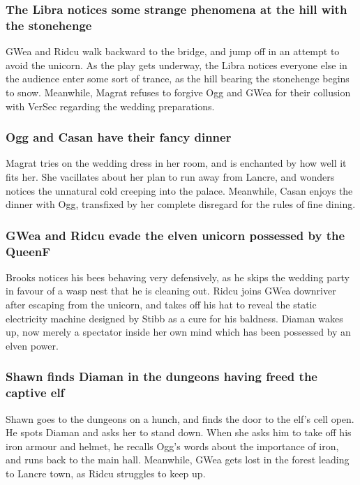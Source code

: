 \subsubsection{The \Gls{Libra} notices some strange phenomena at the hill with the stonehenge}
\Gls{GWea} and \Gls{Ridcu} walk backward to the bridge, and jump off in an attempt to avoid the
unicorn. As the play gets underway, the \Gls{Libra} notices everyone else in the audience enter some
sort of trance, as the hill bearing the stonehenge begins to snow. Meanwhile, \Gls{Magrat} refuses
to forgive \Gls{Ogg} and \Gls{GWea} for their collusion with \Gls{VerSec} regarding the wedding
preparations.

\subsubsection{\Gls{Ogg} and \Gls{Casan} have their fancy dinner}
\Gls{Magrat} tries on the wedding dress in her room, and is enchanted by how well it fits her. She
vacillates about her plan to run away from Lancre, and wonders notices the unnatural cold creeping
into the palace. Meanwhile, \Gls{Casan} enjoys the dinner with \Gls{Ogg}, transfixed by her complete
disregard for the rules of fine dining.

\subsubsection{\Gls{GWea} and \Gls{Ridcu} evade the elven unicorn possessed by the \Gls{QueenF}}
\Gls{Brooks} notices his bees behaving very defensively, as he skips the wedding party in favour of
a wasp nest that he is cleaning out. \Gls{Ridcu} joins \Gls{GWea} downriver after escaping from the
unicorn, and takes off his hat to reveal the static electricity machine designed by \Gls{Stibb} as a
cure for his baldness. \Gls{Diaman} wakes up, now merely a spectator inside her own mind which has
been possessed by an elven power.

\subsubsection{\Gls{Shawn} finds \Gls{Diaman} in the dungeons having freed the captive elf}
\Gls{Shawn} goes to the dungeons on a hunch, and finds the door to the elf's cell open. He spots
\Gls{Diaman} and asks her to stand down. When she asks him to take off his iron armour and helmet,
he recalls \Gls{Ogg}'s words about the importance of iron, and runs back to the main hall.
Meanwhile, \Gls{GWea} gets lost in the forest leading to Lancre town, as \Gls{Ridcu} struggles to
keep up.

